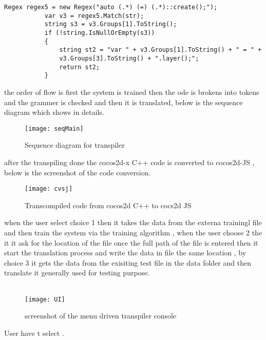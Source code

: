 \documentclass[23pt]{article}
\begin{document}
\begin{lstlisting}[label=some-code,caption= Example of peg grammar]
Regex regex5 = new Regex("auto (.*) (=) (.*)::create();");
           var v3 = regex5.Match(str);
           string s3 = v3.Groups[1].ToString();
           if (!string.IsNullOrEmpty(s3))
           {
               string st2 = "var " + v3.Groups[1].ToString() + " = " +
               v3.Groups[3].ToString() + ".layer();";
               return st2;
           }
\end{lstlisting}
{\Large     \par}



\newpage

{\Large the order of flow is first the system is trained then the ode is brokens into tokens and the grammer is checked and then it is translated, below is the sequence diagram which shows in details. \par}

\begin{figure}[h]
\caption{Sequence diagram for transpiler}
\centering
\texttt{[image: seqMain]}
\end{figure}

{\Large after the transpiling done the cocos2d-x C++ code is converted to cocos2d-JS , below is the screenshot of the code conversion. \par}
\begin{figure}[h]
\caption{Transcompiled code from cocos2d C++ to cocs2d JS}
\centering
\texttt{[image: cvsj]}
\end{figure}

{\Large when the user select choice 1 then it takes the data from the externa trainingl file and then train the system via the training algorithm , when the user choose 2 the it it ask for the location of the file once the full path of the file is entered then it start the translation process and write the data in file the same location , by choice 3 it gets the data from the exisiting test file in the data folder and then translate it generally used for testing purpose. \\ \\ \par}

\begin{figure}[h]
\caption{screenshot of the menu driven transpiler console}
\centering
\texttt{[image: UI]}
\end{figure}

{\Large User have t select . \\ \\ \par}
\end{document}
